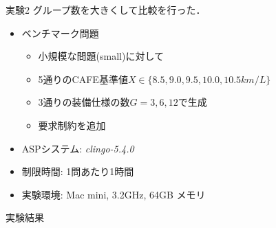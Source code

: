 \documentclass[dvipdfmx, 11pt,]{beamer}
\begin{document}
\begin{frame}{実験2}
 グループ数を大きくして比較を行った．
 \begin{itemize}
  \item ベンチマーク問題
	\begin{itemize}
	 \item 小規模な問題(small)に対して
	 \item 5通りのCAFE基準値$X \in \{8.5, 9.0, 9.5, 10.0, 10.5km/L\}$
	 \item 3通りの装備仕様の数$G=3,6,12$で生成
	 \item 要求制約を追加
	\end{itemize}
  \item ASPシステム: \textit{clingo-5.4.0}
  \item 制限時間: 1問あたり1時間
  \item 実験環境: Mac mini, 3.2GHz, 64GB メモリ
 \end{itemize}
\end{frame}
\begin{frame}{実験結果}
 
\end{frame}
\end{document}

